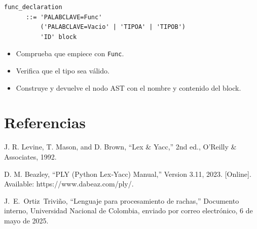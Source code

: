 \documentclass{article}
\begin{document}
\begin{verbatim}
func_declaration 
      ::= 'PALABCLAVE=Func' 
          ('PALABCLAVE=Vacio' | 'TIPOA' | 'TIPOB') 
          'ID' block
\end{verbatim}

\begin{itemize}
    \item Comprueba que empiece con \texttt{Func}.
    \item Verifica que el tipo sea válido.
    \item Construye y devuelve el nodo AST con el nombre y contenido del block.
\end{itemize}



\section{Referencias}
\renewcommand{\refname}{}

\begin{thebibliography}{9}


 \label{ref:lexPy1} J. R. Levine, T. Mason, and D. 
Brown, “Lex \& Yacc,” 2nd ed., O’Reilly \& Associates, 1992.

 \label{ref:lexPy2}  D. M. Beazley, “PLY (Python Lex‐Yacc)
Manual,” Version 3.11, 2023. [Online]. Available: https://www.dabeaz.com/ply/.

 \label{ref:rachas} J.~E.~Ortiz~Triviño, ``Lenguaje para 
  procesamiento de rachas,'' Documento interno, Universidad Nacional de 
    Colombia, enviado por correo electrónico, 6 de mayo de 2025.

\end{thebibliography}
\end{document}
